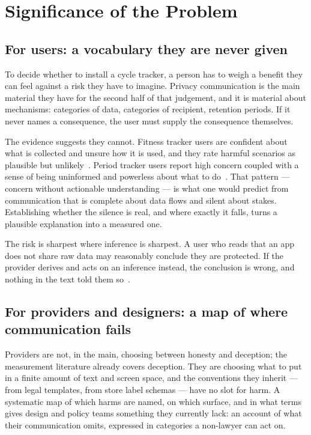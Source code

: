 \section{Significance of the Problem}
\label{sec:significance}

\subsection{For users: a vocabulary they are never given}

To decide whether to install a cycle tracker, a person has to weigh a benefit
they can feel against a risk they have to imagine. Privacy communication is the
main material they have for the second half of that judgement, and it is
material about mechanisms: categories of data, categories of recipient,
retention periods. If it never names a consequence, the user must supply the
consequence themselves.

The evidence suggests they cannot. Fitness tracker users are confident about
what is collected and unsure how it is used, and they rate harmful scenarios as
plausible but unlikely~\parencite{gabriele2020understanding}. Period tracker
users report high concern coupled with a sense of being uninformed and powerless
about what to do~\parencite{cao2024deleted}. That pattern --- concern without
actionable understanding --- is what one would predict from communication that
is complete about data flows and silent about stakes. Establishing whether the
silence is real, and where exactly it falls, turns a plausible explanation into
a measured one.

The risk is sharpest where inference is sharpest. A user who reads that an app
does not share raw data may reasonably conclude they are protected. If the
provider derives and acts on an inference instead, the conclusion is wrong, and
nothing in the text told them so~\parencite{martin2025cookies}.

\subsection{For providers and designers: a map of where communication fails}

Providers are not, in the main, choosing between honesty and deception; the
measurement literature already covers deception. They are choosing what to put
in a finite amount of text and screen space, and the conventions they inherit ---
from legal templates, from store label schemas --- have no slot for harm. A
systematic map of which harms are named, on which surface, and in what terms
gives design and policy teams something they currently lack: an account of what
their communication omits, expressed in categories a non-lawyer can act on.

